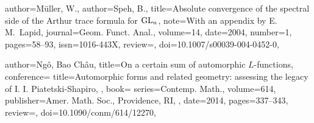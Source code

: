 \documentclass[11pt]{amsart}
\theoremstyle{remark}
\begin{document}
\begin{bibdiv}
\begin{biblist}
%        
%       
%    
    {
       author={M\"uller, W.},
       author={Speh, B.},
       title={Absolute convergence of the spectral side of the Arthur trace
       formula for ${\rm GL}_n$},
       note={With an appendix by E. M.\ Lapid},
       journal={Geom. Funct. Anal.},
       volume={14},
       date={2004},
       number={1},
       pages={58--93},
       issn={1016-443X},
       review={},
       doi={10.1007/s00039-004-0452-0},
    }
%       
	    
   {
       author={Ng\^o, Bao Ch\^au},
       title={On a certain sum of automorphic $L$-functions},
       conference={
       title={Automorphic forms and related geometry: assessing the legacy of
          I. I. Piatetski-Shapiro},
          },
       book={
          series={Contemp. Math.},
          volume={614},
          publisher={Amer. Math. Soc., Providence, RI},
       },
       date={2014},
       pages={337--343},
       review={},
       doi={10.1090/conm/614/12270},
    }


\end{biblist}
\end{bibdiv}
\end{document}
